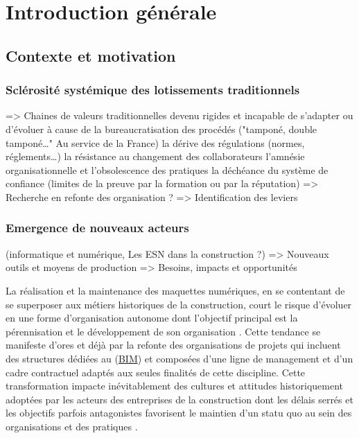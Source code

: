 \documentclass[a4paper,12pt]{article}
\begin{document}
\clearpage

\setcounter{section}{-1}
\section{Introduction générale}
\label{sec:org24df1ec}
\subsection{Contexte et motivation}
\label{sec:org1d90468}
\subsubsection{Sclérosité systémique des lotissements traditionnels}
\label{sec:org51774ad}
=> Chaines de valeurs traditionnelles devenu rigides et incapable de s'adapter ou d'évoluer à cause de
      la bureaucratisation des procédés ("tamponé, double tamponé\ldots{}" Au service de la France)
      la dérive des régulations (normes, réglements\ldots{})   
      la résistance au changement des collaborateurs
      l'amnésie organisationnelle et l'obsolescence des pratiques
      la déchéance du système de confiance (limites de la preuve par la formation ou par la réputation)
=> Recherche en refonte des organisation ?
=> Identification des leviers
\subsubsection{Emergence de nouveaux acteurs}
\label{sec:org441e930}
(informatique et numérique, Les ESN dans la construction ?)
=> Nouveaux outils et moyens de production
=> Besoins, impacts et opportunités

La réalisation et la maintenance des maquettes numériques, en se contentant de se superposer aux métiers historiques de la construction, court le risque d’évoluer en une forme d’organisation autonome dont l’objectif principal est la pérennisation et le développement de son organisation \autocite{lourauAnalyseInstitutionnelleQuestion1973}. Cette tendance se manifeste d’ores et déjà par la refonte des organisations de projets qui incluent des structures dédiées au  (\protect\hyperlink{gls-1}{\label{gls-1-use-1}BIM}) et composées d’une ligne de management et d’un cadre contractuel adaptés aux seules finalités de cette discipline.
Cette transformation impacte inévitablement des cultures et attitudes historiquement adoptées par les acteurs des entreprises de la construction dont les délais serrés et les objectifs parfois antagonistes favorisent le maintien d’un statu quo au sein des organisations et des pratiques \autocite{lindbladBIMImplementationOrganisational2015,paulagordogregorioContinuiteInformationnelleDans2023}. 
\end{document}
